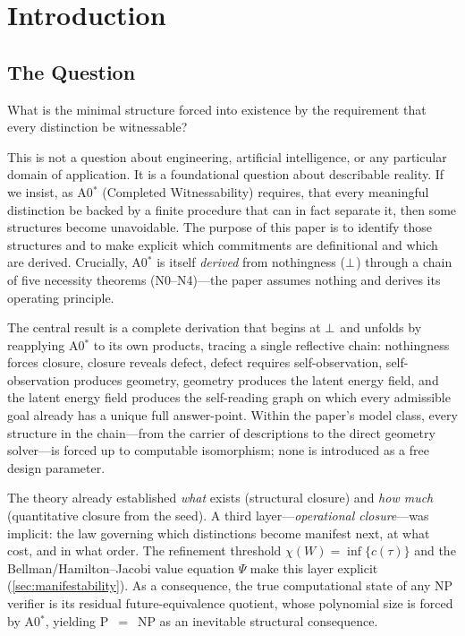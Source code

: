 
\section{Introduction}
\label{sec:introduction}

\subsection{The Question}

What is the minimal structure forced into existence by the requirement that
every distinction be witnessable?

This is not a question about engineering, artificial intelligence, or any
particular domain of application. It is a foundational question about
describable reality. If we insist, as A0$^*$ (Completed Witnessability) requires, that every meaningful
distinction be backed by a finite procedure that can in fact separate it, then
some structures become unavoidable. The purpose of this paper is to identify
those structures and to make explicit which commitments are definitional and
which are derived.  Crucially, A0$^*$ is itself \emph{derived} from
nothingness ($\bot$) through a chain of five necessity theorems
(N0--N4)---the paper assumes nothing and derives its operating principle.

The central result is a complete derivation that begins at $\bot$ and
unfolds by reapplying A0$^*$ to its own products, tracing a single reflective
chain: nothingness forces closure, closure reveals defect, defect requires
self-observation, self-observation produces geometry, geometry produces
the latent energy field, and the latent energy field produces the
self-reading graph on which every admissible goal already has a unique
full answer-point.  Within the paper's model class, every structure in the
chain---from the carrier of descriptions to the direct geometry solver---is
forced up to computable isomorphism; none is introduced as a free design
parameter.

The theory already established \emph{what} exists (structural closure) and
\emph{how much} (quantitative closure from the seed).  A third layer---\emph{operational
closure}---was implicit: the law governing which distinctions become manifest
next, at what cost, and in what order.  The refinement threshold
$\chi(W) = \inf\{c(\tau)\}$ and the Bellman/Hamilton--Jacobi value equation
$\Psi$ make this layer explicit (\cref{sec:manifestability}).  As a consequence,
the true computational state of any NP verifier is its residual
future-equivalence quotient, whose polynomial size is forced by A0$^*$,
yielding P~$=$~NP as an inevitable structural consequence.

